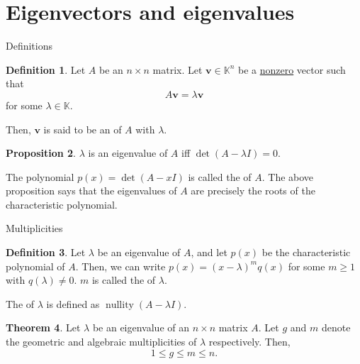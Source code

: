 \documentclass[dvipsnames]{beamer}
\DeclareMathOperator{\nullity}{nullity}
\theoremstyle{definition}
\newtheorem{thm}{Theorem}
\newtheorem{defn}[thm]{Definition}
\newtheorem{prop}[thm]{Proposition}
\let\ge\geqslant
\let\le\leqslant
\begin{document}
\section{Eigenvectors and eigenvalues}
\begin{frame}{Definitions}
    \begin{defn}
        Let $A$ be an $n \times n$ matrix. \pause Let $\mathbf{v} \in \mathbb{K}^{n}$ be a \underline{nonzero} vector such that \pause
        \begin{equation*} 
            A \mathbf{v} = \lambda \mathbf{v}
        \end{equation*}
        for some $\lambda \in \mathbb{K}$. \pause

        Then, $\mathbf{v}$ is said to be an  of $A$ with  $\lambda$.
    \end{defn} \pause

    \begin{prop}
        $\lambda$ is an eigenvalue of $A$ iff $\det(A - \lambda I) = 0$.
    \end{prop} \pause

    The polynomial $p(x) = \det(A - xI)$ is called the  of $A$. \pause The above proposition says that the eigenvalues of $A$ are precisely the roots of the characteristic polynomial.
\end{frame}
\begin{frame}{Multiplicities}
    \begin{defn}
        Let $\lambda$ be an eigenvalue of $A$, and let $p(x)$ be the characteristic polynomial of $A$. \pause \newline
        Then, we can write $p(x) = (x - \lambda)^{m} q(x)$ for some $m \ge 1$ with $q(\lambda) \neq 0$. \pause \newline
        $m$ is called the  of $\lambda$. \pause

        The  of $\lambda$ is defined as $\nullity(A - \lambda I)$.
    \end{defn}

    \begin{thm}
        Let $\lambda$ be an eigenvalue of an $n \times n$ matrix $A$. Let $g$ and $m$ denote the geometric and algebraic multiplicities of $\lambda$ respectively. Then,
        \begin{equation*} 
            1 \le g \le m \le n.
        \end{equation*}
    \end{thm}
\end{frame}
\end{document}
